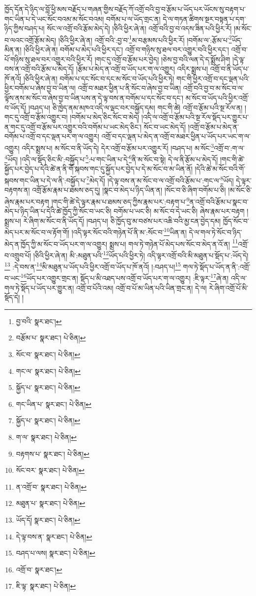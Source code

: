ཁྱོད་དོན་དེ་ཉིད་ལ་བློ་ཕྱི་མས་བརྗོད་པ་གཞན་གྱིས་བརྗོད་ཀོ་འགྲོ་བའི་བྱ་བ་རྩོམ་པ་ཡོད་པར་ཡོངས་སུ་བརྟག་པ་གང་ཡིན་པ་དེ་ཡང་སོང་བའམ་མ་སོང་བའམ། བགོམ་པ་ལ་ཡོད་གྲང་ན། དེ་ལ་གཏན་ཚིགས་སྔར་བསྟན་པ་དག་ཉིད་ཀྱིས་བཤད་པ། སོང་ལ་འགྲོ་བའི་རྩོམ་མེད་དེ། །ཅིའི་ཕྱིར་ཞེ་ན། འགྲོ་བའི་བྱ་བ་འདས་ཟིན་པའི་ཕྱིར་རོ། །མ་སོང་བ་ལའང་འགྲོ་རྩོམ་མེད། །ཅིའི་ཕྱིར་ཞེ་ན། འགྲོ་བའི་:བྱ་བ་\footnote{བྱ་བའི་  སྣར་ཐང་། }མ་བརྩམས་པའི་ཕྱིར་རོ། །བགོམ་ལ་:རྩོམ་པ་\footnote{བརྩོམ་པ་  སྣར་ཐང་།  པེ་ཅིན། }ཡོད་མིན་ན། །ཅིའི་ཕྱིར་ཞེ་ན། བགོམ་པ་མེད་པའི་ཕྱིར་དང་། འགྲོ་བ་གཉིས་སུ་ཐལ་བར་འགྱུར་བའི་ཕྱིར་དང་། འགྲོ་བ་པོ་གཉིས་སུ་ཐལ་བར་འགྱུར་བའི་ཕྱིར་རོ། །གང་དུ་འགྲོ་བ་རྩོམ་པར་བྱེད། །ཅེས་བྱ་བའི་ལན་དེ་ད་སྨྲོས་ཤིག །དེ་ལྟ་བས་ན་འགྲོ་བའི་རྩོམ་པ་མེད་དོ། །རྩོམ་པ་མེད་ན་འགྲོ་བ་ཡོད་པར་ག་ལ་འགྱུར། འདིར་སྨྲས་པ། འགྲོ་བ་ནི་ཡོད་པ་ཁོ་ནའོ། །ཅིའི་ཕྱིར་ཞེ་ན། བགོམ་པ་དང་སོང་བ་དང་མ་སོང་བ་ཡོད་པའི་ཕྱིར་ཏེ། གང་གི་ཕྱིར་འགྲོ་བ་དང་ལྡན་པའི་ཕྱིར་བགོམ་པ་ཞེས་བྱ་བ་ཡིན་ལ། འགྲོ་བ་མཐར་ཕྱིན་པ་ནི་སོང་བ་ཞེས་བྱ་བ་ཡིན། འགྲོ་བའི་བྱ་བ་མ་སོང་བ་ལ་ལྟོས་ནས་མ་སོང་བ་ཞེས་བྱ་བ་ཡིན་པས་ན་དེ་ལྟ་བས་ན་བགོམ་པ་དང་སོང་བ་དང་། མ་སོང་བ་ཡོད་པའི་ཕྱིར་འགྲོ་བ་ཡོད་དོ། །བཤད་པ། ཅི་ཁྱེད་ནམ་མཁའ་འདི་ལ་ལྡང་བར་བསྐྱོད་དམ། གང་གི་ཚེ། འགྲོ་བ་རྩོམ་པའི་སྔ་རོལ་ན། །གང་དུ་འགྲོ་བ་རྩོམ་འགྱུར་བ། །བགོམ་པ་མེད་ཅིང་སོང་བ་མེད། །འདི་ལ་འགྲོ་བ་རྩོམ་པའི་སྔ་རོལ་སྡོད་པར་གྱུར་པ་ན་གང་དུ་འགྲོ་བ་རྩོམ་པར་འགྱུར་བའི་བགོམ་པ་ཡང་མེད་ཅིང་། སོང་བ་ཡང་མེད་དོ། །འགྲོ་བ་རྩོམ་པ་མེད་ན་བགོམ་པ་འགྲོ་བ་དང་ལྡན་པར་ག་ལ་འགྱུར། འགྲོ་བ་དང་ལྡན་པ་མེད་ན་འགྲོ་བ་མཐར་ཕྱིན་པ་ཡོད་པར་ཡང་ག་ལ་འགྱུར། འདིར་སྨྲས་པ། མ་སོང་བ་ནི་ཡོད་དེ། དེར་འགྲོ་བ་རྩོམ་པར་འགྱུར་རོ། །བཤད་པ། མ་སོང་\footnote{སོང་བ་  སྣར་ཐང་།  པེ་ཅིན། }འགྲོ་བ་:ག་ལ་\footnote{གང་ལ་  སྣར་ཐང་།  པེ་ཅིན། }ཡོད། །འདི་ལ་སྡོད་ཅིང་མི་:བསྐྱོད་པ་\footnote{སྐྱོད་པ་  སྣར་ཐང་།  པེ་ཅིན། }:པ་གང་ཡིན་པ་དེ་\footnote{གང་ཡིན་པ་  སྣར་ཐང་།  པེ་ཅིན། }ནི་མ་སོང་བ་སྟེ། དེ་ལ་ནི་རྩོམ་པ་མེད་དོ། །གང་གི་ཚེ་སྐྱོད་པར་བྱེད་པ་དེའི་ཚེ་ན་ནི་གོ་སྐབས་གང་དུ་སྐྱོད་པར་བྱེད་པ་དེ་མ་སོང་བ་མ་ཡིན་ནོ། །དེའི་ཚེ་མ་སོང་བའི་གོ་སྐབས་གང་ཡིན་པ་དེ་ལ་ནི་:བསྐྱོད་པ་\footnote{སྐྱོད་པ་  སྣར་ཐང་།  པེ་ཅིན། }མེད་དོ། །དེ་ལྟ་བས་ན་མ་སོང་བ་ལ་འགྲོ་བའི་རྩོམ་པ་:གང་ལ་\footnote{ག་ལ་  སྣར་ཐང་།  པེ་ཅིན། }ཡོད། དེ་ལྟར་བརྟགས་ན། འགྲོ་རྩོམ་རྣམ་པ་ཐམས་ཅད་དུ། །སྣང་བ་མེད་པ་ཉིད་ཡིན་ན། །སོང་བ་ཅི་ཞིག་བགོམ་པ་ཅི། །མ་སོང་ཅི་ཞེས་རྣམ་པར་བརྟག །གང་གི་ཚེ་དེ་ལྟར་རྣམ་པ་ཐམས་ཅད་ཀྱིས་རྣམ་པར་:བརྟག་པ་\footnote{བརྟགས་པ་  སྣར་ཐང་།  པེ་ཅིན། }ན་འགྲོ་བའི་རྩོམ་པ་སྣང་བ་མེད་པ་ཉིད་ཡིན་པ་དེའི་ཚེ་ཁྱོད་ཀྱི་སོང་བ་ཡང་ཅི། བགོམ་པ་ཡང་ཅི། མ་སོང་བ་དེ་ཡང་ཅི། ཞེས་རྣམ་པར་བརྟག །སྨྲས་པ། རེ་ཞིག་མ་སོང་བ་ནི་ཡོད་དོ། །བཤད་པ། ཅི་ཁྱོད་བུ་མ་བཙས་པར་འཆི་བའི་མྱ་ངན་བྱེད་དམ། ཁྱོད་སོང་བ་མེད་པར་མ་སོང་བ་ལ་རྟོག་གོ། །འདི་ལྟར་སོང་བའི་གཉེན་པོ་ནི་མ་:སོང་བ་\footnote{སོང་བར་  སྣར་ཐང་།  པེ་ཅིན། }ཡིན་ན། དེ་ལ་གལ་ཏེ་སོང་བ་ཉིད་མེད་ན་ཁྱོད་ཀྱི་མ་སོང་བ་ཡོད་པར་ག་ལ་འགྱུར། སྨྲས་པ། གལ་ཏེ་གཉེན་པོ་མེད་པས་སོང་བ་མེད་ན་འོ་ན། \footnote{ན་འགྲོ་བ་  སྣར་ཐང་།  པེ་ཅིན། }འགྲོ་བ་འགྲུབ་པོ། །ཅིའི་ཕྱིར་ཞེ་ན། མི་:མཐུན་པའི་\footnote{མཐུན་པ་  སྣར་ཐང་།  པེ་ཅིན། }ཡོད་པའི་ཕྱིར་ཏེ། འདི་ལྟར་འགྲོ་བའི་མི་མཐུན་པ་སྡོད་པ་:ཡོད་དེ།\footnote{ཡོད་དོ།  སྣར་ཐང་།  པེ་ཅིན། } :དེ་བས་ན་\footnote{དེ་ལྟ་བས་ན་  སྣར་ཐང་།  པེ་ཅིན། }མི་མཐུན་པ་ཡོད་པའི་ཕྱིར་འགྲོ་བ་ཡོད་པ་ཁོ་ནའོ། །:བཤད་པ།\footnote{བཤད་པ་ལས།  སྣར་ཐང་།  པེ་ཅིན། } གལ་ཏེ་སྡོད་པ་ཡོད་ན་ནི་:འགྲོ་བ་ཡང་\footnote{འགྲོ་བ་  སྣར་ཐང་། }ཡོད་པར་འགྱུར་གྲང་ན། སྡོད་པ་མི་འཐད་པས་འགྲོ་བ་ཡོད་པར་ག་ལ་འགྱུར། :ཇི་ལྟར་\footnote{ཇི་ལྟ་  སྣར་ཐང་།  པེ་ཅིན། }ཞེ་ན། འདི་ལ་གལ་ཏེ་སྡོད་པ་ཡོད་པར་གྱུར་ན། འགྲོ་བ་པོའི་འམ། འགྲོ་བ་པོ་མ་ཡིན་པའི་ཡིན་གྲང་ན། དེ་ལ། རེ་ཞིག་འགྲོ་པོ་མི་སྡོད་དེ། །
